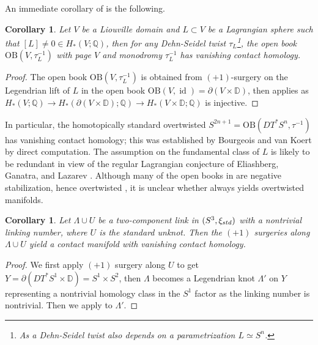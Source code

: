 \documentclass[reqno,11pt]{amsart}
\numberwithin{equation}{section}
\newtheorem{corollary}[theorem]{\textbf{Corollary}}
\newtheorem{remark}[theorem]{\textbf{Remark}}
\def\R{\mathbb{R}}
\def\D{{\mathbb D}}
\def\Q{{\mathbb Q}}
\def\cR{{\mathcal R}}
\def\std{\rm std}
\DeclareMathOperator{\Id}{id}
\begin{document}

An immediate corollary of  is the following.
\begin{corollary}\label{cor:OT}
    Let $V$ be a Liouville domain and $L\subset V$ be a Lagrangian sphere such that $[L]\ne 0 \in H_*(V;\Q)$, then for any Dehn-Seidel twist $\tau_L$\footnote{As a Dehn-Seidel twist also depends on a parametrization $L\simeq S^n$.}, the open book $\mathrm{OB}(V,\tau^{-1}_{L})$ with page $V$ and monodromy $\tau^{-1}_L$ has vanishing contact homology.
\end{corollary}
\begin{proof}
    The open book $\mathrm{OB}(V,\tau^{-1}_{L})$ is obtained from $(+1)$-surgery on the Legendrian lift of $L$ in the open book $\mathrm{OB}(V,\Id)=\partial(V\times \D)$, then  applies as $H_*(V;\Q)\to H_*(\partial(V\times \D);\Q) \to H_*(V\times \D;\Q)$ is injective.
\end{proof}

In particular, the homotopically standard overtwisted $S^{2n+1}= \mathrm{OB}(DT^*S^n,\tau^{-1})$ has vanishing contact homology; this was established by Bourgeois and van Koert \cite{zbMATH05709738} by direct computation. The assumption on the fundamental class of $L$ is likely to be redundant in view of the regular Lagrangian conjecture of Eliashberg, Ganatra, and Lazarev \cite[Problem 2.5]{zbMATH07195660}. Although many of the open books in  are negative stabilization, hence overtwisted \cite{zbMATH07010365}, it is unclear whether  always yields overtwisted manifolds.

\begin{corollary}\label{cor:3D}
    Let $\Lambda \cup U$ be a two-component link in $(S^3,\xi_{\std})$ with a nontrivial linking number, where $U$ is the standard unknot. Then the $(+1)$ surgeries along $\Lambda \cup U$ yield a contact manifold with vanishing contact homology.
\end{corollary}
\begin{proof}
    We first apply $(+1)$ surgery along $U$ to get $Y=\partial(DT^*S^1\times \D)=S^1\times S^2$, then $\Lambda$ becomes a Legendrian knot $\Lambda'$ on $Y$ representing a nontrivial homology class in the $S^1$ factor as the linking number is nontrivial. Then we apply  to $\Lambda'$.
\end{proof}
\end{document}

